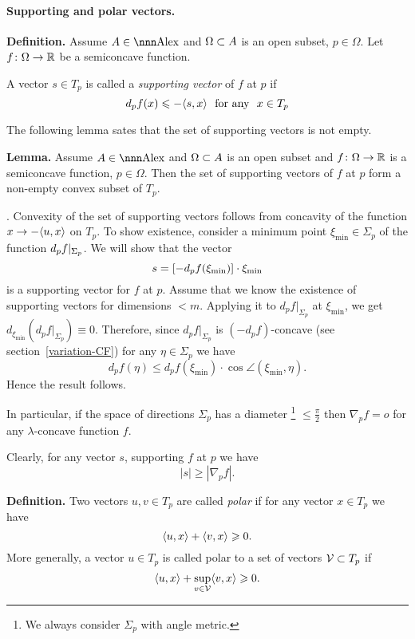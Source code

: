 \documentclass{article}
\begin{document}
\paragraph*{Supporting and polar vectors.}\label{supp-polar}

\begin{thm}{\bf Definition.}\label{def-support} 
Assume $A\in\Alex$ and $\Omega\subset A$ is an open subset, $p\in
\Omega$. 
Let $f\colon\Omega\to \mathbb{R}$ be a semiconcave function.


A vector $s\in T_p$ is called a \emph{supporting vector} of $f$ at $p$ if 
$$\d_p f(x)\le -\langle s , x\rangle\ \ \hbox{for any}\ \ x\in T_p$$
\end{thm}

The following lemma sates that the set of supporting vectors is not empty.

\begin{thm}{\bf Lemma.} 
Assume $A\in\Alex$ and $\Omega\subset A$ is an open subset and $f\colon\Omega\to \mathbb{R}$ is a semiconcave function, $p\in \Omega$. 
Then the set of supporting vectors of $f$ at $p$ form a non-empty convex subset of $T_p$.
\end{thm}

\Proof. Convexity of the set of supporting vectors follows from concavity of the function $x\to -\langle u,x\rangle$ on $T_p$.
To show existence, consider a minimum point  $\xi_{\min}\in \Sigma_p$ of the function $d_p f|_{\Sigma_p}$. 
We will show that the vector
$$s=\left[-d_p f(\xi_{\min})\right]\cdot\xi_{\min}$$
is a supporting vector for $f$ at $p$.
Assume that we know the existence of supporting vectors for dimensions $<m$.
Applying it to $d_p f|_{\Sigma_p}$ at $\xi_{\min}$, we get $d_{\xi_{\min}}(d_p f|_{\Sigma_p})\equiv 0$.
Therefore, since $d_p f|_{\Sigma_p}$ is $(-d_p f)$-concave 
(see section~\ref{variation-CF}) 
for any $\eta\in \Sigma_p$ we have 
$$d_p f(\eta)\le d_p f(\xi_{\min})\cdot\cos\angle(\xi_{\min},\eta).$$
Hence the result follows. \qeds



In particular, if the space of directions $\Sigma_p$ has
a diameter%
\footnote{We always consider $\Sigma_p$ with angle metric.} 
$\le \tfrac\pi2$ then
$\nabla_p f=o$ for any $\lambda$-concave function $f$.

Clearly, for any vector $s$, supporting  $f$ at $p$ we have 
$$|s|\ge|\nabla_p f|.$$

\begin{thm}{\bf Definition.}\label{defn:polar}
Two vectors $u,v\in T_p$ are called \emph{polar} if for any vector $x\in T_p$ we
have 
$$\langle u,x\rangle+\langle v,x\rangle\geqslant0.$$
More generally, a vector $u\in T_p$ is called polar to a set of vectors
$\mathcal{V}\subset T_p$ if 
$$\langle u,x\rangle+\sup_{v\in \mathcal{V}}\langle v,x\rangle\geqslant0.$$
\end{thm}
\end{document}

